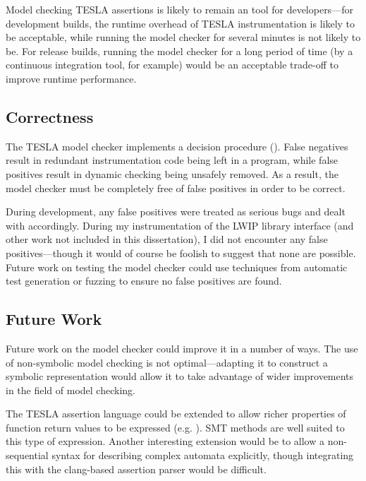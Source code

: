 Model checking TESLA assertions is likely to remain an  tool
for developers---for development builds, the runtime overhead of TESLA
instrumentation is likely to be acceptable, while running the model checker for
several minutes is not likely to be. For release builds, running the model
checker for a long period of time (by a continuous integration tool, for
example) would be an acceptable trade-off to improve runtime performance.

\subsection{Correctness}

The TESLA model checker implements a decision procedure (). False negatives result in redundant instrumentation
code being left in a program, while false positives result in dynamic checking
being unsafely removed. As a result, the model checker must be completely free
of false positives in order to be correct.

During development, any false positives were treated as serious bugs and dealt
with accordingly. During my instrumentation of the LWIP library interface (and
other work not included in this dissertation), I did not encounter any false
positives---though it would of course be foolish to suggest that none are
possible. Future work on testing the model checker could use techniques from
automatic test generation or fuzzing to ensure no false positives are found.

\subsection{Future Work}

Future work on the model checker could improve it in a number of ways. The use
of non-symbolic model checking is not optimal---adapting it to construct a
symbolic representation would allow it to take advantage of wider improvements
in the field of model checking. 

The TESLA assertion language could be extended to allow richer properties of
function return values to be expressed (e.g. ). SMT methods are well suited to this type
of expression. Another interesting extension would be to allow a non-sequential
syntax for describing complex automata explicitly, though integrating this with
the clang-based assertion parser would be difficult.

